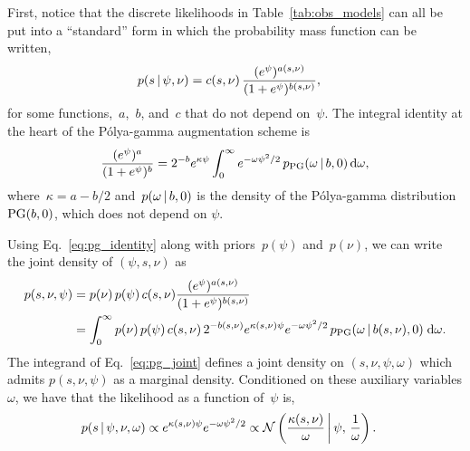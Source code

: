 First, notice that the discrete likelihoods in Table~\ref{tab:obs_models}
can all be put into  a ``standard'' form in which the probability
mass function can be written,
\begin{align*}
  p(s \,|\, \psi, \nu) &= c(s, \nu) \, \frac{(e^\psi)^{a(s, \nu)}}{(1+e^\psi)^{b(s, \nu)}},
\end{align*}
for some functions,~$a$,~$b$, and~$c$ that do not depend on~$\psi$.
The integral identity at the heart of the P\'{o}lya-gamma augmentation scheme  is
\begin{align}
\label{eq:pg_identity}
\frac{(e^{\psi})^a}{(1+e^{\psi})^b} = 2^{-b} e^{\kappa \psi} \int_{0}^{\infty} e^{-\omega \psi^2 /2} \, p_{\mathrm{PG}}(\omega \,|\, b, 0) \, \mathrm{d}\omega,
\end{align}
where~${\kappa=a-b/2}$ and~$p(\omega\,|\, b, 0)$ is the density of the P\'{o}lya-gamma
distribution~${\mathrm{PG}(b, 0)}$, which does not depend on $\psi$.

Using Eq.~\ref{eq:pg_identity} along with priors~$p(\psi)$ and~$p(\nu)$, we can write the joint density of $(\psi, s, \nu)$ as
\begin{align}
  \label{eq:pg_joint}
  \nonumber
  p(s, \nu, \psi)
  &= p(\nu) \, p(\psi) \, c(s, \nu) \frac{(e^\psi)^{a(s, \nu)}}{(1+e^\psi)^{b(s, \nu)}} \\
  &= \int_0^\infty
  p(\nu) \, p(\psi) \, c(s, \nu) \, 2^{-b(s, \nu)} e^{\kappa(s, \nu) \psi} e^{-\omega \psi^2/2} \, p_{\mathrm{PG}}(\omega \,|\, b(s, \nu), 0) \; \mathrm{d}\omega.
\end{align}
The integrand of Eq.~\ref{eq:pg_joint} defines a joint density on $(s, \nu, \psi, \omega)$ which admits $p(s, \nu, \psi)$ as a marginal density.
Conditioned on these auxiliary variables $\omega$, we have that the likelihood as a function of~$\psi$ is,
\begin{align*}
  p(s \,|\, \psi, \nu, \omega)
  &\propto e^{\kappa(s, \nu) \psi} e^{- \omega \psi^2/2} 
\propto \mathcal{N} \left(\frac{\kappa(s, \nu)}{\omega} \, \bigg| \, \psi, \, \frac{1}{\omega} \right).
\end{align*}

